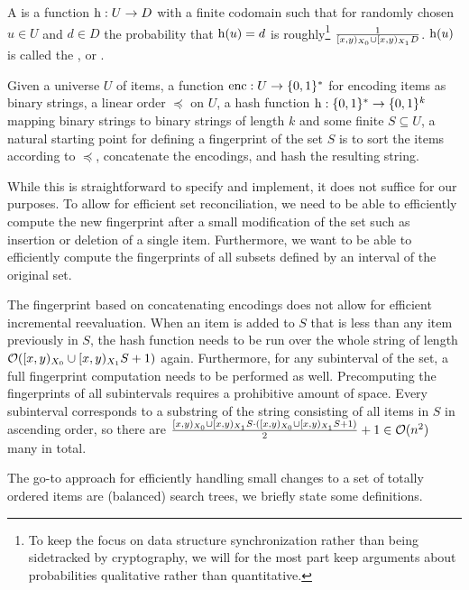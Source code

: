 \begin{definition}
A  is a function ${\operatorname{h}}: {U} \rightarrow {D}$ with a finite codomain such that for randomly chosen $u \in U$ and $d \in D$ the probability that $\operatorname{h}(u) = d$ is roughly\footnote{To keep the focus on data structure synchronization rather than being sidetracked by cryptography, we will for the most part keep arguments about probabilities qualitative rather than quantitative.} $\frac{1}{[{x},{y})_{X_0} \cup [{x},{y})_{X_1}{D}}$. $\operatorname{h}(u)$ is called the ,  or .
\end{definition}

Given a universe $U$ of items, a function $\operatorname{enc} : U \rightarrow \{0, 1\}^{*}$ for encoding items as binary strings, a linear order $\preceq$ on $U$, a hash function $\operatorname{h}: \{0, 1\}^{*} \rightarrow \{0, 1\}^{k}$ mapping binary strings to binary strings of length $k$ and some finite $S \subseteq U$, a natural starting point for defining a fingerprint of the set $S$ is to sort the items according to $\preceq$, concatenate the encodings, and hash the resulting string.

While this is straightforward to specify and implement, it does not suffice for our purposes. To allow for efficient set reconciliation, we need to be able to efficiently compute the new fingerprint after a small modification of the set such as insertion or deletion of a single item. Furthermore, we want to be able to efficiently compute the fingerprints of all subsets defined by an interval of the original set.

The fingerprint based on concatenating encodings does not allow for efficient incremental reevaluation. When an item is added to $S$ that is less than any item previously in $S$, the hash function needs to be run over the whole string of length $\mathcal{O}([{x},{y})_{X_0} \cup [{x},{y})_{X_1}{S} + 1)$ again. Furthermore, for any subinterval of the set, a full fingerprint computation needs to be performed as well. Precomputing the fingerprints of all subintervals requires a prohibitive amount of space. Every subinterval corresponds to a substring of the string consisting of all items in $S$ in ascending order, so there are $\frac{[{x},{y})_{X_0} \cup [{x},{y})_{X_1}{S} \cdot ([{x},{y})_{X_0} \cup [{x},{y})_{X_1}{S} + 1)}{2} + 1 \in \mathcal{O}(n^2)$ many in total.

The go-to approach for efficiently handling small changes to a set of totally ordered items are (balanced) search trees, we briefly state some definitions.

